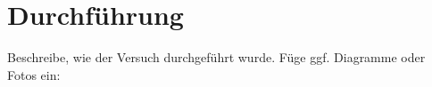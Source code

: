 \section{Durchführung}
Beschreibe, wie der Versuch durchgeführt wurde. Füge ggf. Diagramme oder Fotos ein:
